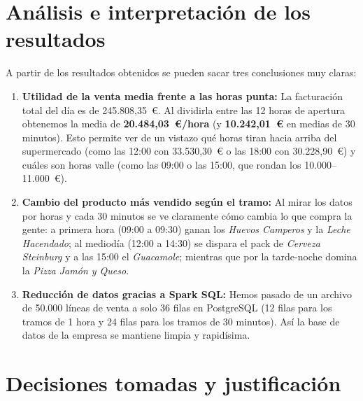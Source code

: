 \documentclass[a4paper,12pt]{article}
\begin{document}
\section{Análisis e interpretación de los resultados}

A partir de los resultados obtenidos se pueden sacar tres conclusiones muy claras:
\begin{enumerate}[leftmargin=1.0cm]
    \item \textbf{Utilidad de la venta media frente a las horas punta:} La facturación total del día es de 245.808,35~\euro{}. Al dividirla entre las 12 horas de apertura obtenemos la media de \textbf{20.484,03~\euro{}/hora} (y \textbf{10.242,01~\euro{}} en medias de 30 minutos). Esto permite ver de un vistazo qué horas tiran hacia arriba del supermercado (como las 12:00 con 33.530,30~\euro{} o las 18:00 con 30.228,90~\euro{}) y cuáles son horas valle (como las 09:00 o las 15:00, que rondan los 10.000--11.000~\euro{}).
    \item \textbf{Cambio del producto más vendido según el tramo:} Al mirar los datos por horas y cada 30 minutos se ve claramente cómo cambia lo que compra la gente: a primera hora (09:00 a 09:30) ganan los \textit{Huevos Camperos} y la \textit{Leche Hacendado}; al mediodía (12:00 a 14:30) se dispara el pack de \textit{Cerveza Steinburg} y a las 15:00 el \textit{Guacamole}; mientras que por la tarde-noche domina la \textit{Pizza Jamón y Queso}.
    \item \textbf{Reducción de datos gracias a Spark SQL:} Hemos pasado de un archivo de 50.000 líneas de venta a solo 36 filas en PostgreSQL (12 filas para los tramos de 1 hora y 24 filas para los tramos de 30 minutos). Así la base de datos de la empresa se mantiene limpia y rapidísima.
\end{enumerate}

\section{Decisiones tomadas y justificación}
\end{document}
